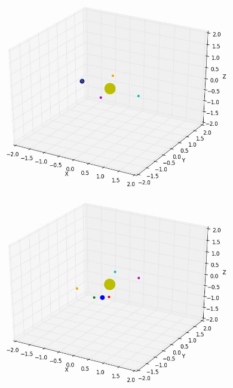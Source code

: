 \documentclass[10pt,letterpaper]{article}
\begin{document}
\begin{figure}[!htb]
  \includegraphics[width=\linewidth]{figures/lagrange_points/lagrange_points_l4_vx_01_1.png}
  \subcaption{}\label{fig:lagrange_points_l4_vx_01_fig1}
\endminipage\hfill
{}
  \includegraphics[width=\linewidth]{figures/lagrange_points/lagrange_points_l4_vx_01_2.png}
  \subcaption{}\label{fig:lagrange_points_l4_vx_01_fig2}
\endminipage\hfill
{}%

\end{figure}
\end{document}

